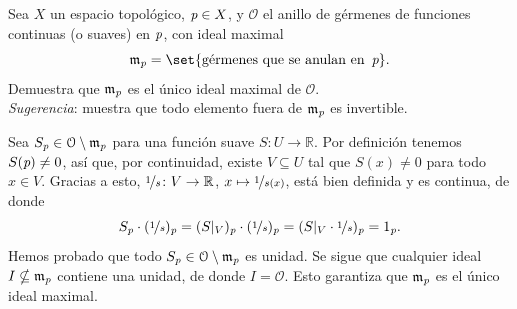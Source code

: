 \begin{ejer}
Sea $X$ un espacio topológico, $\operatorname{\textit{p}}\in X$, y $\mathcal{O}$ el anillo de gérmenes de funciones continuas (o suaves) en $\operatorname{\textit{p}}$, con ideal maximal
\[
\mathfrak{m}_{\p}=\set{\text{gérmenes que se anulan en }\p}.
\]
Demuestra que $\mathfrak{m}_{\operatorname{\textit{p}}}$ es el único ideal maximal de $\mathcal{O}$.\\
\emph{Sugerencia}: muestra que todo elemento fuera de $\mathfrak{m}_{\operatorname{\textit{p}}}$ es invertible.
\end{ejer}
\begin{sol}
Sea $S_{\operatorname{\textit{p}}}\in\mathcal{O}\setminus\mathfrak{m}_{\operatorname{\textit{p}}}$ para una función suave $S\colon U\to\mathbb{R}$. Por definición tenemos $S(\operatorname{\textit{p}})\neq0$, así que, por continuidad, existe $V\subseteq U$ tal que $S(x)\neq0$ para todo $x\in V$. Gracias a esto, $\nicefrac{1}{s}\colon V\to\mathbb{R}$, $x\mapsto\nicefrac{1}{s(x)}$, está bien definida y es continua, de donde
\[
S_{\operatorname{\textit{p}}}\cdot(\nicefrac{1}{s})_{\operatorname{\textit{p}}}=(S|_V)_{\operatorname{\textit{p}}}\cdot(\nicefrac{1}{s})_{\operatorname{\textit{p}}}=(S|_V\cdot\nicefrac{1}{s})_{\operatorname{\textit{p}}}=1_{\operatorname{\textit{p}}}.
\]
Hemos probado que todo $S_{\operatorname{\textit{p}}}\in\mathcal{O}\setminus\mathfrak{m}_{\operatorname{\textit{p}}}$ es unidad. Se sigue que cualquier ideal $I\nsubseteq\mathfrak{m}_{\operatorname{\textit{p}}}$ contiene una unidad, de donde $I=\mathcal{O}$. Esto garantiza que $\mathfrak{m}_{\operatorname{\textit{p}}}$ es el único ideal maximal.
\end{sol}
